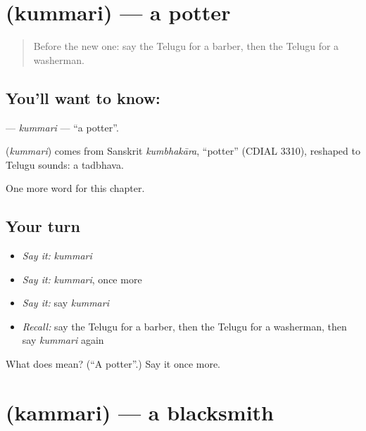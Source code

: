 \section[\texorpdfstring{\te{కుమ్మరి} (kummari)}{కుమ్మరి (kummari)}]{ (kummari) — a potter}

\label{lesson:TE-C277-kummari}



\begin{quote}
Before the new one: say the Telugu for a barber, then the Telugu for a washerman.
\end{quote}

\subsection*{You'll want to know: }
\textbf{} — \emph{kummari} — \textquotedblleft{}a potter\textquotedblright{}.

\begin{cousinweb}
\textbf{} (\emph{kummari}) comes from Sanskrit \emph{kumbhakāra}, \textquotedblleft{}potter\textquotedblright{} (CDIAL 3310), reshaped to Telugu sounds: a tadbhava.
\end{cousinweb}

\begin{grammarlens}[title={What you've built}]
One more word for this chapter.
\end{grammarlens}

\subsection*{Your turn}
\begin{itemize}
\raggedright
  \item \emph{Say it:} \emph{kummari}
  \item \emph{Say it:} \emph{kummari}, once more
  \item \emph{Say it:} say \emph{kummari}
  \item \emph{Recall:} say the Telugu for a barber, then the Telugu for a washerman, then say \emph{kummari} again
\end{itemize}

\begin{tcolorbox}[breakable,colback=teal!4,colframe=teal!35!black,title={Before you move on}]
What does  mean? (\textquotedblleft{}A potter\textquotedblright{}.) Say it once more.
\end{tcolorbox}
\section[\texorpdfstring{\te{కమ్మరి} (kammari)}{కమ్మరి (kammari)}]{ (kammari) — a blacksmith}

